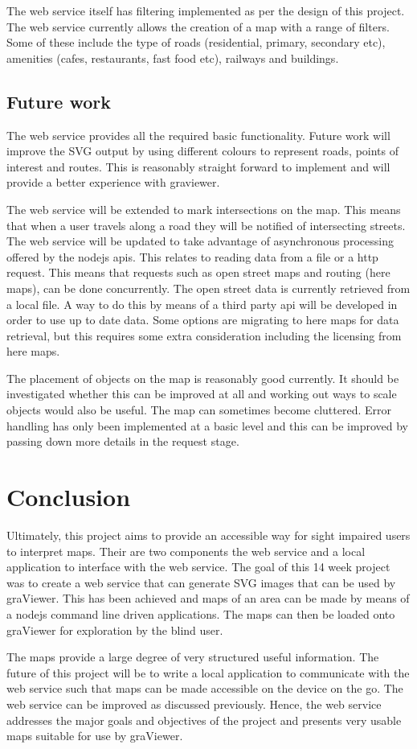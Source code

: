 \documentclass[11pt,twoside,a4paper]{article}
\begin{document}
The web service itself has filtering implemented as per the design of
this project. The web service currently allows the creation of a map
with a range of filters. Some of these include the type of roads
(residential, primary, secondary etc), amenities (cafes, restaurants,
fast food etc), railways and buildings. 
\subsection{Future work}

The web service provides all the required basic functionality. Future
work will improve the SVG output by using different colours to
represent roads, points of interest and routes. This is reasonably
straight forward to implement and will provide a better experience with
graviewer.

The web service will be extended to mark intersections on the map. This
means that when a user travels along a road they will be notified of
intersecting streets. The web service will be updated to take advantage
of asynchronous processing offered by the nodejs apis. This relates to
reading data from a file or a http request. This means that requests
such as open street maps and routing (here maps), can be done
concurrently. The open street data is currently retrieved from a local
file. A way to do this by means of a third party api will be developed
in order to use up to date data. Some options are migrating to here maps
for data retrieval, but this requires some extra consideration including
the licensing from here maps. 

The placement of objects on the map is reasonably good currently. It
should be investigated whether this can be improved at all and working
out ways to scale objects would also be useful. The map can sometimes
become cluttered. Error handling has only been implemented at a basic
level and this can be improved by passing down more details in the
request stage.

\section{Conclusion}
Ultimately, this project aims to provide an accessible way for sight
impaired users to interpret maps. Their are two components the web
service and a local application to interface with the web service. The
goal of this 14 week project was to create a web service that can
generate SVG images that can be used by graViewer. This has been
achieved and maps of an area can be made by means of a nodejs command
line driven applications. The maps can then be loaded onto graViewer for
exploration by the blind user.

The maps provide a large degree of very structured useful
information. The future of this project will be to write a local
application to communicate with the web service such that maps can be
made accessible on the device on the go. The web service can be improved
as discussed previously. Hence, the web service addresses the major
goals and objectives of the project and presents very usable maps
suitable for use by graViewer. 


\end{document}
